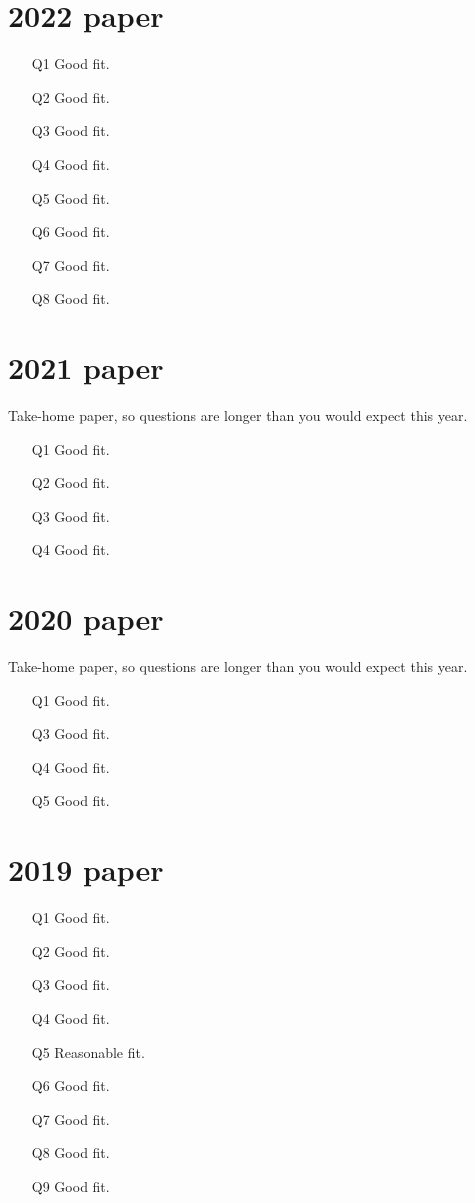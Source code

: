 \begin{multicols}{2}
\section*{2022 paper}
\begin{itemize}
\item[Q1] Good fit.
\item[Q2] Good fit.
\item[Q3] Good fit.
\item[Q4] Good fit.
\item[Q5] Good fit.
\item[Q6] Good fit.
\item[Q7] Good fit.
\item[Q8] Good fit.
\end{itemize}

\section*{2021 paper}
Take-home paper, so questions are longer than you would expect this year.
\begin{itemize}
\item[Q1] Good fit.
\item[Q2] Good fit.
\item[Q3] Good fit.
\item[Q4] Good fit.
\end{itemize}

\section*{2020 paper}
Take-home paper, so questions are longer than you would expect this year.
\begin{itemize}
\item[Q1] Good fit.
\item[Q3] Good fit.
\item[Q4] Good fit.
\item[Q5] Good fit.
\end{itemize}

\section*{2019 paper}
\begin{itemize}
\item[Q1] Good fit.
\item[Q2] Good fit.
\item[Q3] Good fit.
\item[Q4] Good fit.
\item[Q5] Reasonable fit.
\item[Q6] Good fit.
\item[Q7] Good fit.
\item[Q8] Good fit. 
\item[Q9] Good fit.
\end{itemize}


\end{multicols}
